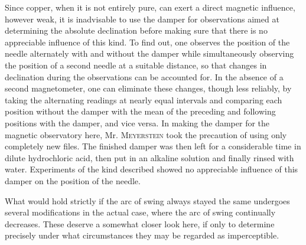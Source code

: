 Since copper, when it is not entirely pure, can exert a direct magnetic influence, however weak, it is inadvisable to use the damper for observations aimed at determining the absolute declination before making sure that there is no appreciable influence of this kind. To find out, one observes the position of the needle alternately with and without the damper while simultaneously observing the position of a second needle at a suitable distance, so that changes in declination during the observations can be accounted for. In the absence of a second magnetometer, one can eliminate these changes, though less reliably, by taking the alternating readings at nearly equal intervals and comparing each position without the damper with the mean of the preceding and following positions with the damper, and vice versa. In making the damper for the magnetic observatory here, Mr. \textsc{Meyerstein} took the precaution of using only completely new files. The finished damper was then left for a considerable time in dilute hydrochloric acid, then put in an alkaline solution and finally rinsed with water. Experiments of the kind described showed no appreciable influence of this damper on the position of the needle.

What would hold strictly if the arc of swing always stayed the same undergoes several modifications in the actual case, where the arc of swing continually decreases. These deserve a somewhat closer look here, if only to determine precisely under what circumstances they may be regarded as imperceptible.

